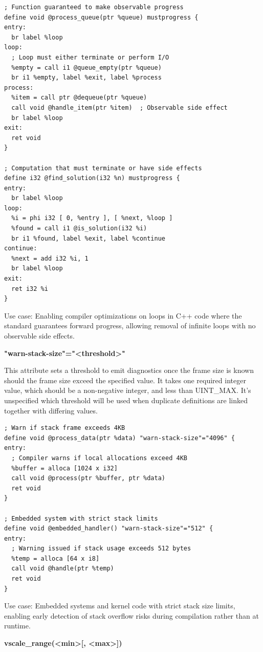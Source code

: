 \begin{lstlisting}[style=ir]
; Function guaranteed to make observable progress
define void @process_queue(ptr %queue) mustprogress {
entry:
  br label %loop
loop:
  ; Loop must either terminate or perform I/O
  %empty = call i1 @queue_empty(ptr %queue)
  br i1 %empty, label %exit, label %process
process:
  %item = call ptr @dequeue(ptr %queue)
  call void @handle_item(ptr %item)  ; Observable side effect
  br label %loop
exit:
  ret void
}

; Computation that must terminate or have side effects
define i32 @find_solution(i32 %n) mustprogress {
entry:
  br label %loop
loop:
  %i = phi i32 [ 0, %entry ], [ %next, %loop ]
  %found = call i1 @is_solution(i32 %i)
  br i1 %found, label %exit, label %continue
continue:
  %next = add i32 %i, 1
  br label %loop
exit:
  ret i32 %i
}
\end{lstlisting}

Use case: Enabling compiler optimizations on loops in C++ code where the standard guarantees forward progress, allowing removal of infinite loops with no observable side effects.

\textbf{"warn-stack-size"="<threshold>"}

This attribute sets a threshold to emit diagnostics once the frame size is known should the frame size exceed the specified value.
It takes one required integer value, which should be a non-negative integer, and less than UINT\_MAX.
It's unspecified which threshold will be used when duplicate definitions are linked together with differing values.

\begin{lstlisting}[style=ir]
; Warn if stack frame exceeds 4KB
define void @process_data(ptr %data) "warn-stack-size"="4096" {
entry:
  ; Compiler warns if local allocations exceed 4KB
  %buffer = alloca [1024 x i32]
  call void @process(ptr %buffer, ptr %data)
  ret void
}

; Embedded system with strict stack limits
define void @embedded_handler() "warn-stack-size"="512" {
entry:
  ; Warning issued if stack usage exceeds 512 bytes
  %temp = alloca [64 x i8]
  call void @handle(ptr %temp)
  ret void
}
\end{lstlisting}

Use case: Embedded systems and kernel code with strict stack size limits, enabling early detection of stack overflow risks during compilation rather than at runtime.

\textbf{vscale\_range(<min>[, <max>])}

